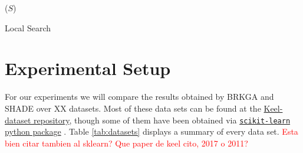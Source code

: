 \documentclass[review]{elsarticle}
\begin{document}
\begin{algorithm}
	\SetNlSkip{0.5em}
	\BlankLine
	\BlankLine
	\KwRet ($S$)
	
\caption{Local Search}\label{alg:LS}
\end{algorithm}

\clearpage

\section{Experimental Setup}

For our experiments we will compare the results obtained by BRKGA and SHADE over XX datasets. Most of these data sets can be found at the \href{https://sci2s.ugr.es/keel/category.php?cat=clas}{Keel-dataset repository}\cite{triguero2017keel}, though some of them have been obtained via
\href{https://scikit-learn.org/stable/datasets/index.html}{\texttt{scikit-learn} python package} \cite{scikit-learn}. Table \ref{tab:datasets} displays a summary of every data set. \textcolor{red}{Esta bien citar tambien al sklearn? Que paper de keel cito, 2017 o 2011?}
\end{document}
